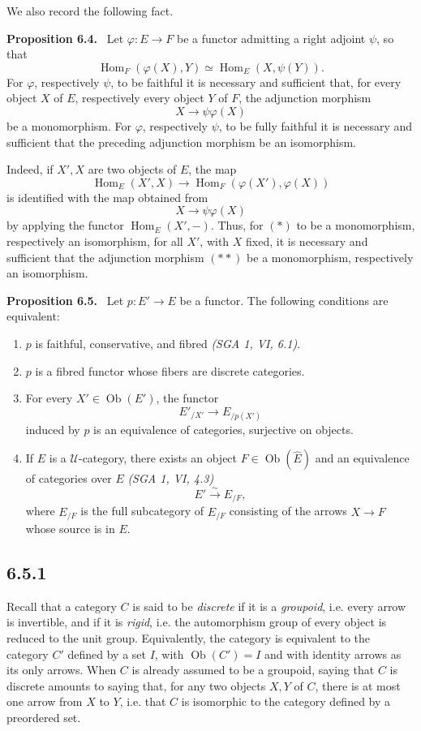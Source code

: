\documentclass[11pt]{article}
\newcommand{\U}{\mathcal{U}}
\newcommand{\Ob}{\operatorname{Ob}}
\newcommand{\Hom}{\operatorname{Hom}}
\newenvironment{statement}[1]{\par\medskip\noindent\textbf{#1.}\ }{\par\medskip}
\begin{document}
We also record the following fact.

\begin{statement}{Proposition 6.4}
Let $\varphi:E\to F$ be a functor admitting a right adjoint $\psi$, so that
\[
\Hom_F(\varphi(X),Y)\simeq \Hom_E(X,\psi(Y)).
\]
For $\varphi$, respectively $\psi$, to be faithful it is necessary and sufficient that, for every object $X$ of $E$, respectively every object $Y$ of $F$, the adjunction morphism
\[
X\longrightarrow \psi\varphi(X)
\]
be a monomorphism. For $\varphi$, respectively $\psi$, to be fully faithful it is necessary and sufficient that the preceding adjunction morphism be an isomorphism.
\end{statement}

Indeed, if $X',X$ are two objects of $E$, the map
\[
\Hom_E(X',X)\longrightarrow \Hom_F(\varphi(X'),\varphi(X))\tag{$*$}
\]
is identified with the map obtained from
\[
X\longrightarrow \psi\varphi(X)\tag{$**$}
\]
by applying the functor $\Hom_E(X',-)$. Thus, for $(*)$ to be a monomorphism, respectively an isomorphism, for all $X'$, with $X$ fixed, it is necessary and sufficient that the adjunction morphism $(**)$ be a monomorphism, respectively an isomorphism.

\begin{statement}{Proposition 6.5}
Let $p:E'\to E$ be a functor. The following conditions are equivalent:
\begin{enumerate}[label=(\roman*)]
\item $p$ is faithful, conservative, and fibred \emph{(SGA 1, VI, 6.1)}.
\item $p$ is a fibred functor whose fibers are discrete categories.
\item For every $X'\in\Ob(E')$, the functor
\[
E'_{/X'}\longrightarrow E_{/p(X')}
\]
induced by $p$ is an equivalence of categories, surjective on objects.
\item If $E$ is a $\U$-category, there exists an object $F\in\Ob(\widehat E)$ and an equivalence of categories over $E$ \emph{(SGA 1, VI, 4.3)}
\[
E'\xrightarrow{\sim}E_{/F},
\]
where $E_{/F}$ is the full subcategory of $\widehat E_{/F}$ consisting of the arrows $X\to F$ whose source is in $E$.
\end{enumerate}
\end{statement}

\subsection*{6.5.1}
Recall that a category $C$ is said to be \emph{discrete} if it is a \emph{groupoid}, i.e. every arrow is invertible, and if it is \emph{rigid}, i.e. the automorphism group of every object is reduced to the unit group. Equivalently, the category is equivalent to the category $C'$ defined by a set $I$, with $\Ob(C')=I$ and with identity arrows as its only arrows. When $C$ is already assumed to be a groupoid, saying that $C$ is discrete amounts to saying that, for any two objects $X,Y$ of $C$, there is at most one arrow from $X$ to $Y$, i.e. that $C$ is isomorphic to the category defined by a preordered set.
\end{document}
